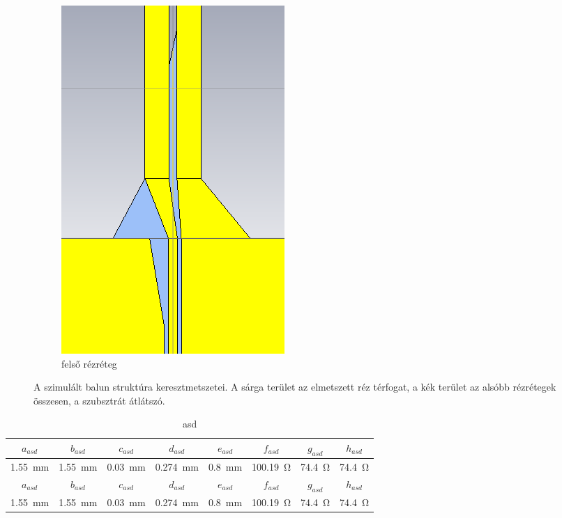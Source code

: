 \begin{figure}[h]
\begin{subfigure}[b]{0.3\textwidth}
		\includegraphics[width=\textwidth]{kep/results/balun_3.png}
		\caption{felső rézréteg}
	\end{subfigure}
	\caption{A szimulált balun struktúra keresztmetszetei. A sárga terület az elmetszett réz térfogat, a kék terület az alsóbb rézrétegek összesen, a szubsztrát átlátszó.}
	\label{fig:balun-kereszt}
\end{figure}
\begin{table}[h!]
	\centering
	\begin{tabular}{|c|c|c|c|c|c|c|c|}
	\hline
	$a_{asd}$ & $b_{asd}$ & $c_{asd}$ & $d_{asd}$ & $e_{asd}$ & $f_{asd}$ & $g_{asd}$ & $h_{asd}$ \\ 
	\hline
	\SI{1,55}{mm} & \SI{1,55}{mm} & \SI{0,03}{mm} & \SI{0,274}{mm} & \SI{0,8}{mm} & \SI{100,19}{\ohm} & \SI{74,4}{\ohm} & \SI{74,4}{\ohm}\\
	\hline\hline
	$a_{asd}$ & $b_{asd}$ & $c_{asd}$ & $d_{asd}$ & $e_{asd}$ & $f_{asd}$ & $g_{asd}$ & $h_{asd}$ \\
	\hline
	\SI{1,55}{mm} & \SI{1,55}{mm} & \SI{0,03}{mm} & \SI{0,274}{mm} & \SI{0,8}{mm} & \SI{100,19}{\ohm} & \SI{74,4}{\ohm} & \SI{74,4}{\ohm}\\
	\hline
	\end{tabular}
	\caption{asd}
	\label{tab:balun-param}
\end{table}
